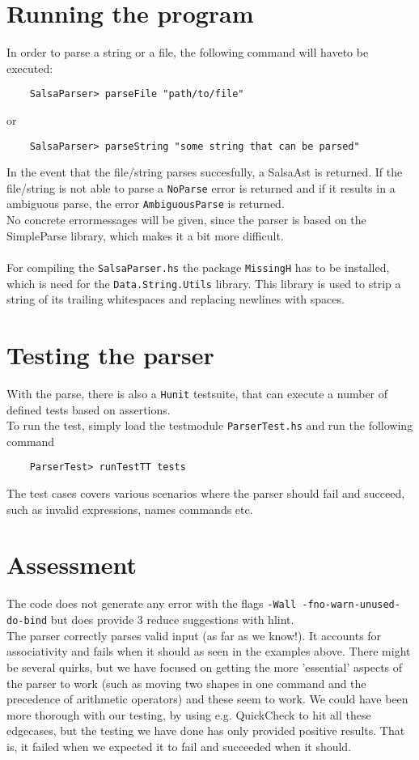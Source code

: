 \documentclass[a4paper]{article}
\begin{document}
\section*{Running the program}
In order to parse a string or a file, the following command will haveto be executed:
\begin{verbatim}
    SalsaParser> parseFile "path/to/file"
\end{verbatim}
or
\begin{verbatim}
    SalsaParser> parseString "some string that can be parsed"
\end{verbatim}
In the event that the file/string parses succesfully, a SalsaAst is returned. If the file/string is not able to parse a \texttt{NoParse} error is returned and if it results in a ambiguous parse, the error \texttt{AmbiguousParse} is returned.\\
No concrete errormessages will be given, since the parser is based on the SimpleParse library, which makes it a bit more difficult.\\ \\

For compiling the \texttt{SalsaParser.hs} the package \texttt{MissingH} has to be installed, which is need for the \texttt{Data.String.Utils} library. This library is used to strip a string of its trailing whitespaces and replacing newlines with spaces.
\section*{Testing the parser}
With the parse, there is also a \texttt{Hunit} testsuite, that can execute a number of defined tests based on assertions.\\
To run the test, simply load the testmodule \texttt{ParserTest.hs} and run the following command
\begin{verbatim}
    ParserTest> runTestTT tests
\end{verbatim}
The test cases covers various scenarios where the parser should fail and succeed, such as invalid expressions, names commands etc.\\
\section*{Assessment}
The code does not generate any error with the flags \texttt{-Wall -fno-warn-unused-do-bind} but does provide 3 reduce suggestions with hlint. \\
The parser correctly parses valid input (as far as we know!). It accounts for associativity and fails when it should as seen in the examples above.
There might be several quirks, but we have focused on getting the more 'essential' aspects of the parser to work (such as moving two shapes in one command and the precedence of arithmetic operators) and these seem to work.
We could have been more thorough with our testing, by using e.g. QuickCheck to hit all these edgecases, but the testing we have done has only provided positive results. That is, it failed when we expected it to fail and succeeded when it should.
\end{document}
